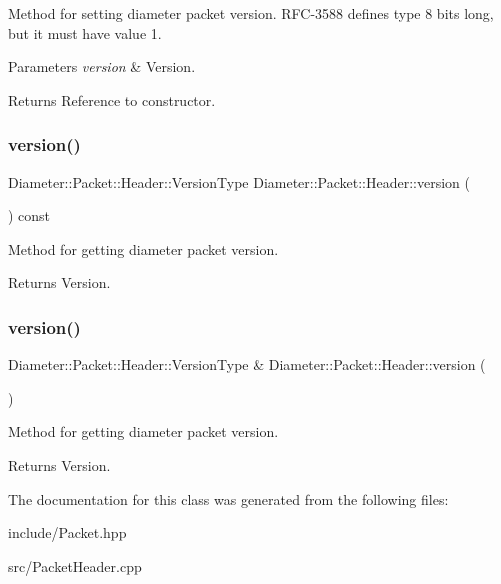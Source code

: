 Method for setting diameter packet version. R\+F\+C-\/3588 defines type 8 bits long, but it must have value 1. 


\begin{DoxyParams}{Parameters}
{\em version} & Version. \\
\hline
\end{DoxyParams}
\begin{DoxyReturn}{Returns}
Reference to constructor. 
\end{DoxyReturn}
\mbox{\label{classDiameter_1_1Packet_1_1Header_a8b2344000890055a9ef037888d0442c3}} 
\subsubsection{\texorpdfstring{version()}{version()}\hspace{0.1cm}{\footnotesize\ttfamily [1/2]}}
{\footnotesize\ttfamily Diameter\+::\+Packet\+::\+Header\+::\+Version\+Type Diameter\+::\+Packet\+::\+Header\+::version (\begin{DoxyParamCaption}{ }\end{DoxyParamCaption}) const}



Method for getting diameter packet version. 

\begin{DoxyReturn}{Returns}
Version. 
\end{DoxyReturn}
\mbox{\label{classDiameter_1_1Packet_1_1Header_aa1cb9b6dfa3b802fe3f0df1bfc938c1d}} 
\subsubsection{\texorpdfstring{version()}{version()}\hspace{0.1cm}{\footnotesize\ttfamily [2/2]}}
{\footnotesize\ttfamily Diameter\+::\+Packet\+::\+Header\+::\+Version\+Type \& Diameter\+::\+Packet\+::\+Header\+::version (\begin{DoxyParamCaption}{ }\end{DoxyParamCaption})}



Method for getting diameter packet version. 

\begin{DoxyReturn}{Returns}
Version. 
\end{DoxyReturn}


The documentation for this class was generated from the following files\+:\begin{DoxyCompactItemize}
\item 
include/Packet.\+hpp\item 
src/Packet\+Header.\+cpp\end{DoxyCompactItemize}
